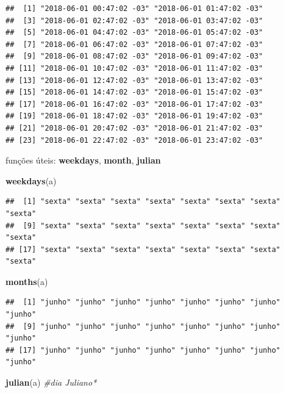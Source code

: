 \documentclass[]{book}
\newenvironment{Shaded}{\begin{snugshade}}{\end{snugshade}}
\newcommand{\KeywordTok}[1]{\textcolor[rgb]{0.13,0.29,0.53}{\textbf{#1}}}
\newcommand{\CommentTok}[1]{\textcolor[rgb]{0.56,0.35,0.01}{\textit{#1}}}
\newcommand{\NormalTok}[1]{#1}
\theoremstyle{definition}
\theoremstyle{definition}
\theoremstyle{definition}
\theoremstyle{remark}
\begin{document}
\begin{verbatim}
##  [1] "2018-06-01 00:47:02 -03" "2018-06-01 01:47:02 -03"
##  [3] "2018-06-01 02:47:02 -03" "2018-06-01 03:47:02 -03"
##  [5] "2018-06-01 04:47:02 -03" "2018-06-01 05:47:02 -03"
##  [7] "2018-06-01 06:47:02 -03" "2018-06-01 07:47:02 -03"
##  [9] "2018-06-01 08:47:02 -03" "2018-06-01 09:47:02 -03"
## [11] "2018-06-01 10:47:02 -03" "2018-06-01 11:47:02 -03"
## [13] "2018-06-01 12:47:02 -03" "2018-06-01 13:47:02 -03"
## [15] "2018-06-01 14:47:02 -03" "2018-06-01 15:47:02 -03"
## [17] "2018-06-01 16:47:02 -03" "2018-06-01 17:47:02 -03"
## [19] "2018-06-01 18:47:02 -03" "2018-06-01 19:47:02 -03"
## [21] "2018-06-01 20:47:02 -03" "2018-06-01 21:47:02 -03"
## [23] "2018-06-01 22:47:02 -03" "2018-06-01 23:47:02 -03"
\end{verbatim}

funções úteis: \textbf{weekdays}, \textbf{month}, \textbf{julian}

\begin{Shaded}
\begin{Highlighting}[]
\KeywordTok{weekdays}\NormalTok{(a)}
\end{Highlighting}
\end{Shaded}

\begin{verbatim}
##  [1] "sexta" "sexta" "sexta" "sexta" "sexta" "sexta" "sexta" "sexta"
##  [9] "sexta" "sexta" "sexta" "sexta" "sexta" "sexta" "sexta" "sexta"
## [17] "sexta" "sexta" "sexta" "sexta" "sexta" "sexta" "sexta" "sexta"
\end{verbatim}

\begin{Shaded}
\begin{Highlighting}[]
\KeywordTok{months}\NormalTok{(a)}
\end{Highlighting}
\end{Shaded}

\begin{verbatim}
##  [1] "junho" "junho" "junho" "junho" "junho" "junho" "junho" "junho"
##  [9] "junho" "junho" "junho" "junho" "junho" "junho" "junho" "junho"
## [17] "junho" "junho" "junho" "junho" "junho" "junho" "junho" "junho"
\end{verbatim}

\begin{Shaded}
\begin{Highlighting}[]
\KeywordTok{julian}\NormalTok{(a) }\CommentTok{#dia Juliano*}
\end{Highlighting}
\end{Shaded}
\end{document}

